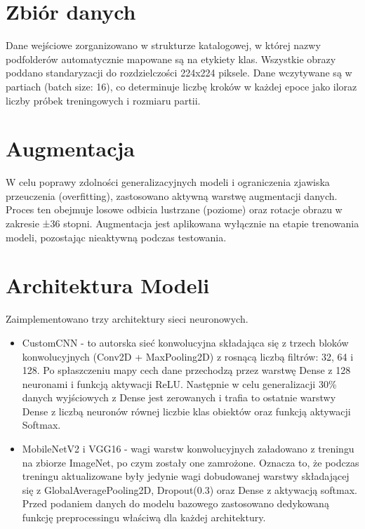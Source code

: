 \documentclass[12pt,a4paper]{report}
\begin{document}
\section{Zbiór danych}
Dane wejściowe zorganizowano w strukturze katalogowej, w której nazwy podfolderów automatycznie mapowane są na etykiety klas. Wszystkie obrazy poddano standaryzacji do rozdzielczości 224x224 piksele. Dane wczytywane są w partiach (batch size: 16), co determinuje liczbę kroków w każdej epoce jako iloraz liczby próbek treningowych i rozmiaru partii.

\section{Augmentacja}

W celu poprawy zdolności generalizacyjnych modeli i ograniczenia zjawiska przeuczenia (overfitting), zastosowano aktywną warstwę augmentacji danych. Proces ten obejmuje losowe odbicia lustrzane (poziome) oraz rotacje obrazu w zakresie ±36 stopni. Augmentacja jest aplikowana wyłącznie na etapie trenowania modeli, pozostając nieaktywną podczas testowania.

\section{Architektura Modeli}

Zaimplementowano trzy architektury sieci neuronowych.

\begin{itemize}
    \item CustomCNN - to autorska sieć konwolucyjna składająca się z trzech bloków konwolucyjnych (Conv2D + MaxPooling2D) z rosnącą liczbą filtrów: 32, 64 i 128. Po spłaszczeniu mapy cech dane przechodzą przez warstwę Dense z 128 neuronami i funkcją aktywacji ReLU. Następnie w celu generalizacji 30\% danych wyjściowych z Dense jest zerowanych i trafia to ostatnie warstwy Dense z liczbą neuronów równej liczbie klas obiektów oraz funkcją aktywacji Softmax.
    \item MobileNetV2 i VGG16 - wagi warstw konwolucyjnych załadowano z treningu na zbiorze ImageNet, po czym zostały one zamrożone. Oznacza to, że podczas treningu aktualizowane były jedynie wagi dobudowanej warstwy składającej się z GlobalAveragePooling2D, Dropout(0.3) oraz Dense z aktywacją softmax. Przed podaniem danych do modelu bazowego zastosowano dedykowaną funkcję preprocessingu właściwą dla każdej architektury.
\end{itemize}
\end{document}
